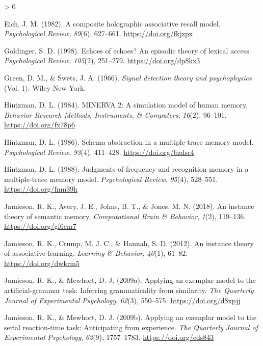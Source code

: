 \documentclass[
  english,
  man,floatsintext]{apa6}
\newlength{\cslhangindent}
\newenvironment{CSLReferences}[2] %
 {%
  \setlength{\parindent}{0pt}
  \ifodd #1 \everypar{\setlength{\hangindent}{\cslhangindent}}\ignorespaces\fi
  \ifnum #2 > 0
  \setlength{\parskip}{#2\baselineskip}
  \fi
 }%
 {}
\begin{document}
\begin{CSLReferences}{1}{0}
\leavevmode\hypertarget{ref-eichCompositeHolographicAssociative1982}{}%
Eich, J. M. (1982). A composite holographic associative recall model. \emph{Psychological Review}, \emph{89}(6), 627--661. \url{https://doi.org/fkjzpx}

\leavevmode\hypertarget{ref-goldingerEchoesEchoesEpisodic1998}{}%
Goldinger, S. D. (1998). Echoes of echoes? {An} episodic theory of lexical access. \emph{Psychological Review}, \emph{105}(2), 251--279. \url{https://doi.org/dp8kx3}

\leavevmode\hypertarget{ref-greenSignalDetectionTheory1966}{}%
Green, D. M., \& Swets, J. A. (1966). \emph{Signal detection theory and psychophysics} (Vol. 1). {Wiley New York}.

\leavevmode\hypertarget{ref-hintzmanMINERVASimulationModel1984}{}%
Hintzman, D. L. (1984). {MINERVA} 2: {A} simulation model of human memory. \emph{Behavior Research Methods, Instruments, \& Computers}, \emph{16}(2), 96--101. \url{https://doi.org/fx78p6}

\leavevmode\hypertarget{ref-hintzmanSchemaAbstractionMultipletrace1986}{}%
Hintzman, D. L. (1986). Schema abstraction in a multiple-trace memory model. \emph{Psychological Review}, \emph{93}(4), 411--428. \url{https://doi.org/bzdsr4}

\leavevmode\hypertarget{ref-hintzmanJudgmentsFrequencyRecognition1988}{}%
Hintzman, D. L. (1988). Judgments of frequency and recognition memory in a multiple-trace memory model. \emph{Psychological Review}, \emph{95}(4), 528--551. \url{https://doi.org/fnm39h}

\leavevmode\hypertarget{ref-jamiesonInstanceTheorySemantic2018}{}%
Jamieson, R. K., Avery, J. E., Johns, B. T., \& Jones, M. N. (2018). An instance theory of semantic memory. \emph{Computational Brain \& Behavior}, \emph{1}(2), 119--136. \url{https://doi.org/gf6cm7}

\leavevmode\hypertarget{ref-jamiesonInstanceTheoryAssociative2012}{}%
Jamieson, R. K., Crump, M. J. C., \& Hannah, S. D. (2012). An instance theory of associative learning. \emph{Learning \& Behavior}, \emph{40}(1), 61--82. \url{https://doi.org/dwkrm5}

\leavevmode\hypertarget{ref-jamiesonApplyingExemplarModel2009}{}%
Jamieson, R. K., \& Mewhort, D. J. (2009a). Applying an exemplar model to the artificial-grammar task: {Inferring} grammaticality from similarity. \emph{The Quarterly Journal of Experimental Psychology}, \emph{62}(3), 550--575. \url{https://doi.org/d8xpjj}

\leavevmode\hypertarget{ref-jamiesonApplyingExemplarModel2009a}{}%
Jamieson, R. K., \& Mewhort, D. J. (2009b). Applying an exemplar model to the serial reaction-time task: {Anticipating} from experience. \emph{The Quarterly Journal of Experimental Psychology}, \emph{62}(9), 1757--1783. \url{https://doi.org/cds843}


\end{CSLReferences}
\end{document}
